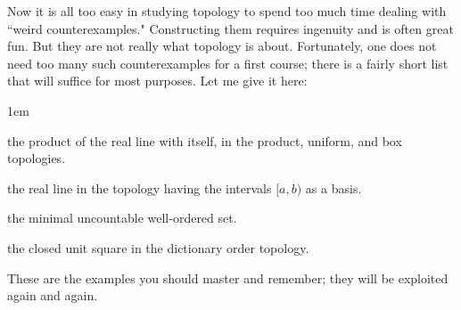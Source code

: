 Now it is all too easy in studying topology to spend too much time dealing with 
``weird counterexamples." Constructing them requires ingenuity and is often great 
fun. But they are not really what topology is about. Fortunately, one does not 
need too many such counterexamples for a first course; there is a fairly short list 
that will suffice for most purposes. Let me give it here:

\begin{description}\advance\leftskip 1em
  \item[\({\mathbb{R}}^{J}\)] the product of the real line with itself, in the product, uniform, and box topologies.
  \item[\({\mathbb{R}}_{\ell}\)] the real line in the topology having the intervals \([a,b)\) as a basis.
  \item[\({S}_{\Omega}\)] the minimal uncountable well-ordered set.
  \item[\({I}_{o}^{2}\)] the closed unit square in the dictionary order topology.
\end{description}

These are the examples you should master and remember; they will be exploited again and again.